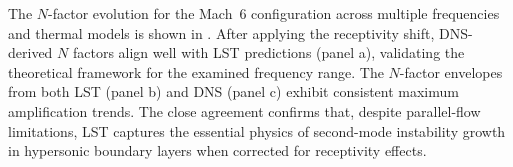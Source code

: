 The $N$-factor evolution for the Mach~6 configuration across multiple frequencies and thermal models is shown in . After applying the receptivity shift, \gls{DNS}-derived $N$ factors align well with \gls{LST} predictions (panel a), validating the theoretical framework for the examined frequency range. The $N$-factor envelopes from both \gls{LST} (panel b) and \gls{DNS} (panel c) exhibit consistent maximum amplification trends. The close agreement confirms that, despite parallel-flow limitations, \gls{LST} captures the essential physics of second-mode instability growth in hypersonic boundary layers when corrected for receptivity effects.


